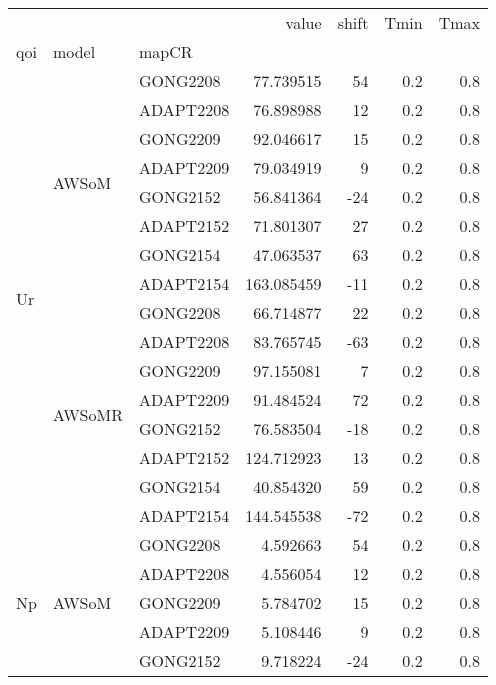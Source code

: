 \begin{tabular}{lllrrrr}
\toprule
  &        &           &         value &  shift &  Tmin &  Tmax \\
qoi & model & mapCR &               &        &       &       \\
\midrule
\multirow{16}{*}{Ur} & \multirow{8}{*}{AWSoM} & GONG2208 &     77.739515 &     54 &   0.2 &   0.8 \\
  &        & ADAPT2208 &     76.898988 &     12 &   0.2 &   0.8 \\
  &        & GONG2209 &     92.046617 &     15 &   0.2 &   0.8 \\
  &        & ADAPT2209 &     79.034919 &      9 &   0.2 &   0.8 \\
  &        & GONG2152 &     56.841364 &    -24 &   0.2 &   0.8 \\
  &        & ADAPT2152 &     71.801307 &     27 &   0.2 &   0.8 \\
  &        & GONG2154 &     47.063537 &     63 &   0.2 &   0.8 \\
  &        & ADAPT2154 &    163.085459 &    -11 &   0.2 &   0.8 \\
\cline{2-7}
  & \multirow{8}{*}{AWSoMR} & GONG2208 &     66.714877 &     22 &   0.2 &   0.8 \\
  &        & ADAPT2208 &     83.765745 &    -63 &   0.2 &   0.8 \\
  &        & GONG2209 &     97.155081 &      7 &   0.2 &   0.8 \\
  &        & ADAPT2209 &     91.484524 &     72 &   0.2 &   0.8 \\
  &        & GONG2152 &     76.583504 &    -18 &   0.2 &   0.8 \\
  &        & ADAPT2152 &    124.712923 &     13 &   0.2 &   0.8 \\
  &        & GONG2154 &     40.854320 &     59 &   0.2 &   0.8 \\
  &        & ADAPT2154 &    144.545538 &    -72 &   0.2 &   0.8 \\
\cline{1-7}
\cline{2-7}
\multirow{16}{*}{Np} & \multirow{8}{*}{AWSoM} & GONG2208 &      4.592663 &     54 &   0.2 &   0.8 \\
  &        & ADAPT2208 &      4.556054 &     12 &   0.2 &   0.8 \\
  &        & GONG2209 &      5.784702 &     15 &   0.2 &   0.8 \\
  &        & ADAPT2209 &      5.108446 &      9 &   0.2 &   0.8 \\
  &        & GONG2152 &      9.718224 &    -24 &   0.2 &   0.8 \\

\end{tabular}
